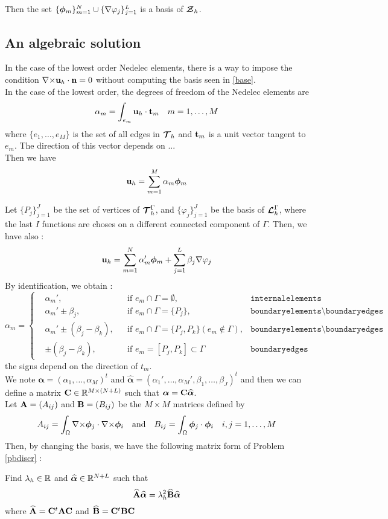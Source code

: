 Then the set $\{\bm{\phi}_m\}_{m=1}^N\cup  \{{\nabla}\varphi_j\}_{j=1}^L$
is a basis of ${\bm{\mathcal{Z}}}_h$.

\subsection{An algebraic solution}
In the case of the lowest order Nedelec elements, there is a way to impose the
condition ${\nabla\times}{\mathbf{u}}_h\cdot{\mathbf{n}}=0$ without computing the basis seen in
  \ref{base}.\\
In the case of the lowest order, the degrees of freedom of the Nedelec elements
are \[\alpha_m=\int_{e_m} {\mathbf{u}}_h\cdot{\mathbf{t}}_m \quad m=1,\dots,M\] where $\{e_1,\dots,e_M\}$ is the set
of all edges in ${\bm{\mathcal{T}}}_h$ and ${\mathbf{t}}_m$ is a unit vector tangent to $e_m$. The
direction of this vector depends on ...\\
Then we have \[{\mathbf{u}}_h = \sum_{m=1}^M \alpha_m\bm{\phi}_m\]

Let $\{P_j\}_{j=1}^J$ be the set of vertices of ${\bm{\mathcal{T}}}_h^\Gamma$, and
$\{\varphi_j\}_{j=1}^J$ be the basis of ${\bm{\mathcal{L}}}_h^\Gamma$, where the last $I$
functions are choses on a different connected component of $\Gamma$. Then, we have also :
\[ {\mathbf{u}}_h = \sum_{m=1}^N \alpha_m'\bm{\phi}_m + \sum_{j=1}^L
\beta_j{\nabla}\varphi_j \]
By identification, we obtain :
\[
\alpha_m=\left\{\begin{aligned}
&\alpha_m', &&\mbox{if } e_m\cap\Gamma = \emptyset, &\texttt{internalelements}\\
&\alpha_m'\pm \beta_j, &&\mbox{if } e_m\cap\Gamma = \{P_j\},& \texttt{boundaryelements}\setminus\texttt{boundaryedges}\\
&\alpha_m'\pm (\beta_j-\beta_k), &&\mbox{if } e_m\cap\Gamma = \{P_j,P_k\}
(e_m\notin\Gamma),& \texttt{boundaryelements}\setminus\texttt{boundaryedges}\\
&\pm (\beta_j-\beta_k), &&\mbox{if } e_m=[P_j,P_k]\subset\Gamma & \texttt{boundaryedges}
\end{aligned}\right.
\]
the signs depend on the direction of $t_m$.\\

We note $\bm{\alpha}=(\alpha_1,\dots,\alpha_M)^t$ and
$\widehat{\bm{\alpha}}=(\alpha_1',\dots,\alpha_M',\beta_1,\dots,\beta_J)^t$ and
then we can define a matrix ${\mathbf{C}}\in{\mathbb{R}}^{M\times(N+L)}$ such that $\bm{\alpha}={\mathbf{C}}\widehat{\bm{\alpha}}$.\\

Let ${\mathbf{A}}=(A_{ij})$ and ${\mathbf{B}}=(B_{ij})$ be the $M\times M$ matrices defined
by 
\[A_{ij}=\int_\Omega {\nabla\times}\bm{\phi}_j\cdot{\nabla\times}\bm{\phi}_i \quad\mbox{and}\quad
B_{ij}=\int_\Omega\bm{\phi}_j\cdot\bm{\phi}_i\quad i,j=1,\dots,M \]
Then, by changing the basis, we have the following matrix form of Problem
\ref{pbdiscr} :
\begin{pb}\label{pbmat}
Find $\lambda_h\in{\mathbb{R}}$ and $\widehat{\bm{\alpha}}\in{\mathbb{R}}^{N+L}$ such that
\[ \widehat{{\mathbf{A}}}\widehat{\bm{\alpha}} =
\lambda_h^2\widehat{{\mathbf{B}}}\widehat{\bm{\alpha}} \]
where $\widehat{{\mathbf{A}}}={\mathbf{C}}^t{\mathbf{A}}{\mathbf{C}}$ and $\widehat{{\mathbf{B}}}={\mathbf{C}}^t{\mathbf{B}}{\mathbf{C}}$
\end{pb}

